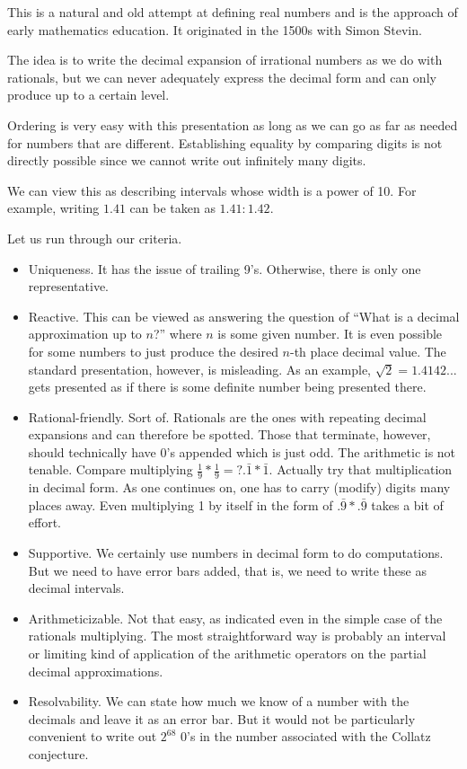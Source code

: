 \documentclass[12pt]{article}
\theoremstyle{remark}
\begin{document}
This is a natural and old attempt at defining real numbers and is the approach of early mathematics education. It originated in the 1500s with Simon Stevin. 

The idea is to write the decimal expansion of irrational numbers as we do with rationals, but we can never adequately express the decimal form and can only produce up to a certain level. 

Ordering is very easy with this presentation as long as we can go as far as needed for numbers that are different. Establishing equality by comparing digits is not directly possible since we cannot write out infinitely many digits. 

We can view this as describing intervals whose width is a power of 10. For example, writing $1.41$ can be taken as $1.41:1.42$. 

Let us run through our criteria. 

\begin{itemize}
    \item Uniqueness. It has the issue of trailing 9's. Otherwise, there is only one representative. 
    \item Reactive. This can be viewed as answering the question of ``What is a decimal approximation up to $n$?'' where $n$ is some given number. It is even possible for some numbers to just produce the desired $n$-th place decimal value. The standard presentation, however, is misleading. As an example, $\sqrt{2} = 1.4142...$ gets presented as if there is some definite number being presented there. 
    \item Rational-friendly. Sort of. Rationals are the ones with repeating decimal expansions and can therefore be spotted. Those that terminate, however, should technically have 0's appended which is just odd. The arithmetic is not tenable. Compare multiplying $\tfrac{1}{9}*\tfrac{1}{9} =? .\bar{1} * \bar{1}$. Actually try that multiplication in decimal form. As one continues on, one has to carry (modify) digits many places away. Even multiplying 1 by itself in the form of $.\bar{9}*.\bar{9}$ takes a bit of effort. 
    \item Supportive. We certainly use numbers in decimal form to do computations. But we need to have error bars added, that is, we need to write these as decimal intervals. 
    \item Arithmeticizable. Not that easy, as indicated even in the simple case of the rationals multiplying. The most straightforward way is probably an interval or limiting kind of application of the arithmetic operators on the partial decimal approximations. 
    \item Resolvability. We can state how much we know of a number with the decimals and leave it as an error bar. But it would not be particularly convenient to write out $2^{68}$ 0's in the number associated with the Collatz conjecture. 
\end{itemize}
\end{document}

